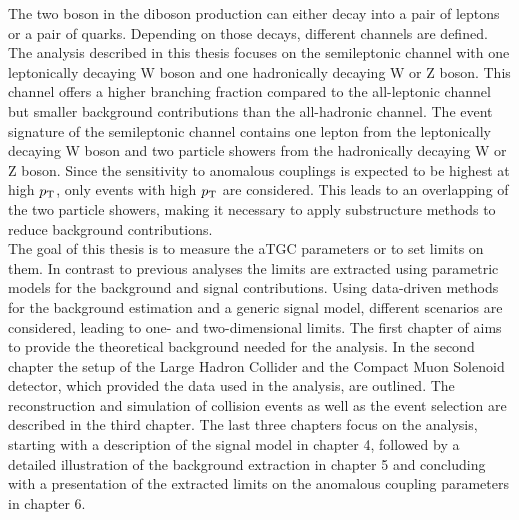 The two boson in the diboson production can either decay into a pair of leptons or a pair of quarks. Depending on those decays, different channels are defined. The analysis described in this thesis focuses on the semileptonic channel with one leptonically decaying W boson and one hadronically decaying W or Z boson. This channel offers a higher branching fraction compared to the all-leptonic channel but smaller background contributions than the all-hadronic channel. The event signature of the semileptonic channel contains one lepton from the leptonically decaying W boson and two particle showers from the hadronically decaying W or Z boson. Since the sensitivity to anomalous couplings is expected to be highest at high $p_{\rm T}$, only events with high $p_{\rm T}$ are considered. This leads to an overlapping of the two particle showers, making it necessary to apply substructure methods to reduce background contributions. \\

The goal of this thesis is to measure the aTGC parameters or to set limits on them. In contrast to previous analyses the limits are extracted using parametric models for the background and signal contributions. Using data-driven methods for the background estimation and a generic signal model, different scenarios are considered, leading to one- and two-dimensional limits. The first chapter of aims to provide the theoretical background needed for the analysis. In the second chapter the setup of the Large Hadron Collider and the Compact Muon Solenoid detector, which provided the data used in the analysis, are outlined. The reconstruction and simulation of collision events as well as the event selection are described in the third chapter. The last three chapters focus on the analysis, starting with a description of the signal model in chapter 4, followed by a detailed illustration of the background extraction in chapter 5 and concluding with a presentation of the extracted limits on the anomalous coupling parameters in chapter 6.





